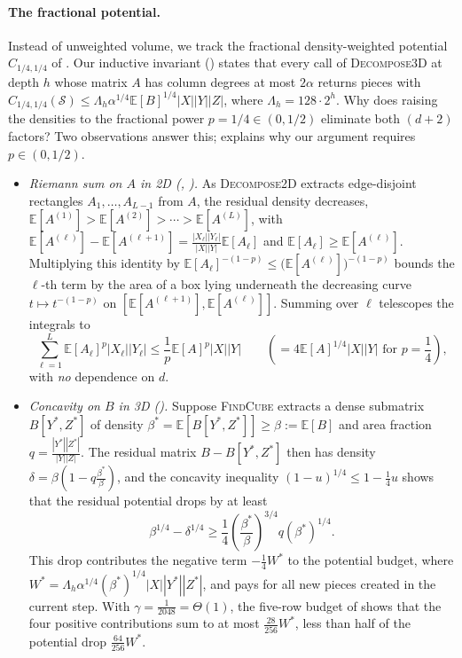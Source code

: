 \documentclass[11pt]{article}
\theoremstyle{definition}
\newcommand{\E}{\mathbb{E}}
\newcommand{\abs}[1]{\left\lvert #1 \right\rvert}
\newcommand{\dens}[1]{\E[#1]}
\newcommand{\pot}{C_{1/4,1/4}}
\newcommand{\DecomposeTwoD}{\textnormal{\textsc{Decompose2D}}}
\newcommand{\FindCube}{\textnormal{\textsc{FindCube}}}
\newcommand{\DecomposeThreeD}{\textnormal{\textsc{Decompose3D}}}
\begin{document}
\paragraph{The fractional potential.}
Instead of unweighted volume, we track the fractional density-weighted potential $\pot$ of . Our inductive invariant () states that every call of \DecomposeThreeD{} at depth $h$ whose matrix $A$ has column degrees at most $2\alpha$ returns pieces with $\pot(\mathcal{S}) \le \Lambda_h \alpha^{1/4}\dens{B}^{1/4}\abs{X}\abs{Y}\abs{Z}$, where $\Lambda_h = 128 \cdot 2^h$. Why does raising the densities to the fractional power $p = 1/4 \in (0, 1/2)$ eliminate both $(d+2)$ factors? Two observations answer this;  explains why our argument requires $p \in (0, 1/2)$.
\begin{itemize}[leftmargin=*]
    \item \emph{Riemann sum on $A$ in 2D (, ).} As \DecomposeTwoD{} extracts edge-disjoint rectangles $A_1, \dots, A_{L-1}$ from $A$, the residual density decreases, $\dens{A^{(1)}} > \dens{A^{(2)}} > \cdots > \dens{A^{(L)}}$, with $\dens{A^{(\ell)}} - \dens{A^{(\ell+1)}} = \frac{\abs{X_\ell}\abs{Y_\ell}}{\abs{X}\abs{Y}}\dens{A_\ell}$ and $\dens{A_\ell} \ge \dens{A^{(\ell)}}$. Multiplying this identity by $\dens{A_\ell}^{-(1-p)} \le \big(\dens{A^{(\ell)}}\big)^{-(1-p)}$ bounds the $\ell$-th term by the area of a box lying underneath the decreasing curve $t \mapsto t^{-(1-p)}$ on $[\dens{A^{(\ell+1)}}, \dens{A^{(\ell)}}]$. Summing over $\ell$ telescopes the integrals to
    \[
        \sum_{\ell=1}^L \dens{A_\ell}^p\abs{X_\ell}\abs{Y_\ell} \le \frac{1}{p}\dens{A}^p\abs{X}\abs{Y} \qquad \left(= 4\dens{A}^{1/4}\abs{X}\abs{Y} \text{ for } p = \frac{1}{4}\right),
    \]
    with \emph{no} dependence on $d$.
    \item \emph{Concavity on $B$ in 3D ().} Suppose \FindCube{} extracts a dense submatrix $B[Y^*, Z^*]$ of density $\beta^* = \dens{B[Y^*, Z^*]} \ge \beta := \dens{B}$ and area fraction $q = \frac{\abs{Y^*}\abs{Z^*}}{\abs{Y}\abs{Z}}$. The residual matrix $B - B[Y^*, Z^*]$ then has density $\delta = \beta(1 - q\frac{\beta^*}{\beta})$, and the concavity inequality $(1 - u)^{1/4} \le 1 - \frac{1}{4}u$ shows that the residual potential drops by at least
    \[
        \beta^{1/4} - \delta^{1/4} \ge \frac{1}{4}\left(\frac{\beta^*}{\beta}\right)^{3/4} q (\beta^*)^{1/4}.
    \]
    This drop contributes the negative term $-\frac{1}{4} W^*$ to the potential budget, where $W^* = \Lambda_h \alpha^{1/4}(\beta^*)^{1/4}\abs{X}\abs{Y^*}\abs{Z^*}$, and pays for all new pieces created in the current step. With $\gamma = \frac{1}{2048} = \Theta(1)$, the five-row budget of  shows that the four positive contributions sum to at most $\frac{28}{256}W^*$, less than half of the potential drop $\frac{64}{256}W^*$.
\end{itemize}
\end{document}
